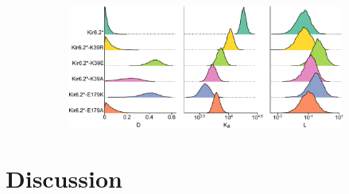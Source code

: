 \begin{figure}[h]
\begin{subfigure}[t]{0.6\textwidth}
		\caption{}\label{ch5fig:mwc_k39_2}
		\centering
		\includegraphics[width=\textwidth]{mwc_k39_2.pdf}
	\end{subfigure}
	\caption[E179 and K39 mutations alter binding and gating]{
	}\label{ch5fig:k39}
\end{figure}

\section{Discussion}